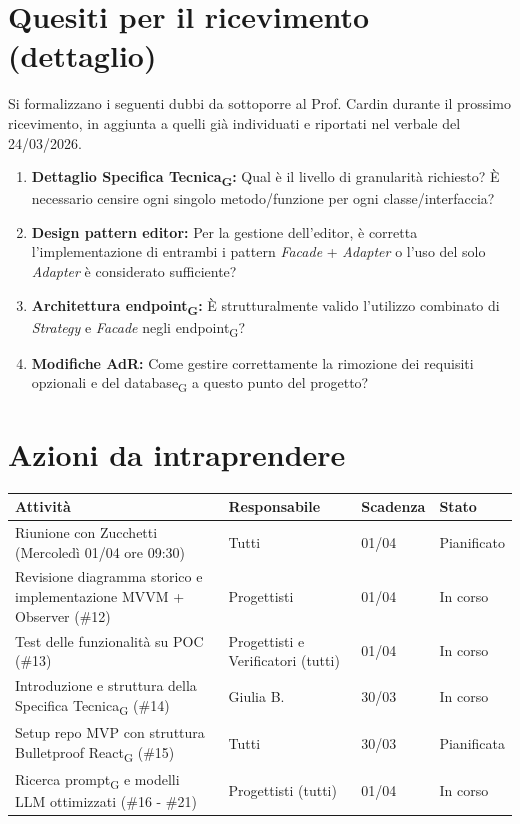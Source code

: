 \documentclass[a4paper,12pt]{article}
\newcommand{\gls}[1]{#1\textsubscript{G}}
\begin{document}
\section*{Quesiti per il ricevimento (dettaglio)}
Si formalizzano i seguenti dubbi da sottoporre al Prof. Cardin durante il prossimo ricevimento, in aggiunta a quelli già individuati e riportati nel verbale del 24/03/2026.
\begin{enumerate}
    \item \textbf{Dettaglio \gls{Specifica Tecnica}:} Qual è il livello di granularità richiesto? È necessario censire ogni singolo metodo/funzione per ogni classe/interfaccia?
    \item \textbf{Design pattern editor:} Per la gestione dell'editor, è corretta l'implementazione di entrambi i pattern \textit{Facade} + \textit{Adapter} o l'uso del solo \textit{Adapter} è considerato sufficiente?
    \item \textbf{Architettura \gls{endpoint}:} È strutturalmente valido l'utilizzo combinato di \textit{Strategy} e \textit{Facade} negli \gls{endpoint}?
    \item \textbf{Modifiche AdR:} Come gestire correttamente la rimozione dei requisiti opzionali e del \gls{database} a questo punto del progetto?
\end{enumerate}

\section*{Azioni da intraprendere}
\begin{longtable}{|p{}|p{}|p{}|p{}|}
\hline
\textbf{Attività} & \textbf{Responsabile} & \textbf{Scadenza} & \textbf{Stato} \\ \hline
Riunione con Zucchetti (Mercoledì 01/04 ore 09:30) & Tutti & 01/04 & Pianificato \\ \hline
Revisione diagramma storico e implementazione MVVM + Observer (\#12) & Progettisti & 01/04 & In corso \\ \hline
Test delle funzionalità su POC (\#13) & Progettisti e Verificatori (tutti) & 01/04 & In corso \\ \hline
Introduzione e struttura della \gls{Specifica Tecnica} (\#14) & Giulia B. & 30/03 & In corso \\ \hline
Setup repo MVP con struttura Bulletproof \gls{React} (\#15) & Tutti & 30/03 & Pianificata \\ \hline
Ricerca \gls{prompt} e modelli LLM ottimizzati (\#16 - \#21) & Progettisti (tutti) & 01/04 & In corso \\ \hline
\end{longtable}
\end{document}
